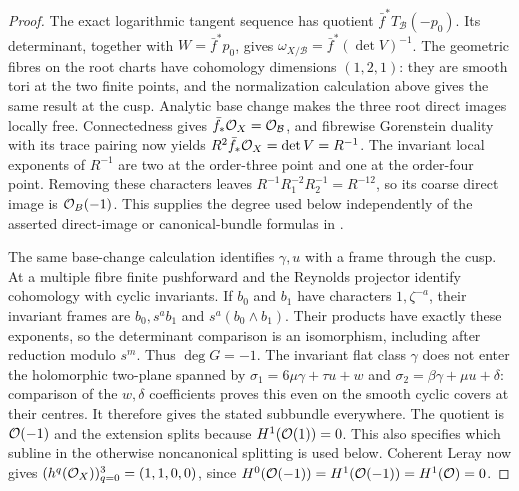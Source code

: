 \begin{proof}
The exact logarithmic tangent sequence has quotient
$\bar f^*T_{\mathcal B}(-p_0)$.  Its determinant, together with
$W=\bar f^*p_0$, gives
$\omega_{X/\mathcal B}=\bar f^*(\det V)^{-1}$.
The geometric fibres on the root charts have cohomology dimensions
$(1,2,1)$: they are smooth tori at the two finite points, and the
normalization calculation above gives the same result at the cusp.
Analytic base change makes the three root direct images locally free.
Connectedness gives $\bar f_*\mathcal O_X=\mathcal O_{\mathcal B}$, and fibrewise
Gorenstein duality with its trace pairing now yields
$R^2\bar f_*\mathcal O_X=\det V=R^{-1}$.  The invariant local exponents
of $R^{-1}$ are two at the order-three point and one at the
order-four point.  Removing these characters leaves
$R^{-1}R_1^{-2}R_2^{-1}=R^{-12}$, so its coarse direct image is
$\mathcal O_B(-1)$.  This supplies the degree used below independently of
the asserted direct-image or canonical-bundle formulas in \citet{AC2026}.

The same base-change calculation identifies $\gamma,u$ with a
frame through the cusp.  At a multiple fibre finite pushforward and the
Reynolds projector identify cohomology with cyclic invariants.  If $b_0$
and $b_1$ have characters $1,\zeta^{-a}$, their invariant frames are
$b_0,s^ab_1$ and $s^a(b_0\wedge b_1)$.  Their products have exactly
these exponents, so the determinant comparison is an isomorphism,
including after reduction modulo $s^m$.  Thus $\deg G=-1$.
The invariant flat class $\gamma$ does not enter the holomorphic
two-plane spanned by
$\sigma_1=6\mu\gamma+\tau u+w$ and
$\sigma_2=\beta\gamma+\mu u+\delta$: comparison of the $w,\delta$
coefficients proves this even on the smooth cyclic covers at their
centres.  It therefore gives the stated subbundle everywhere.
The quotient is $\mathcal O(-1)$ and the extension splits because
$H^1(\mathcal O(1))=0$.  This also specifies which subline in the otherwise
noncanonical splitting is used below.  Coherent Leray now gives
$(h^q(\mathcal O_X))_{q=0}^3=(1,1,0,0)$, since
$H^0(\mathcal O(-1))=H^1(\mathcal O(-1))=H^1(\mathcal O)=0$.
\end{proof}

